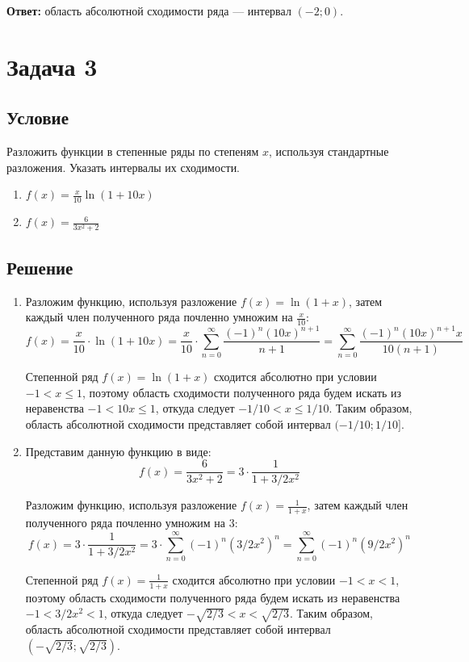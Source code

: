 \documentclass[12pt]{article}
\begin{document}
	\hspace{150pt}\textbf{Ответ:} область абсолютной сходимости ряда --- интервал $ (-2;0) $.

	\newpage

	\section*{Задача 3}	
	\subsection*{Условие}
	
	Разложить функции в степенные ряды по степеням $ x $, используя стандартные разложения. Указать интервалы их сходимости.

	\begin{enumerate}
		\item $ f(x) = \frac{x}{10} \ln{(1 + 10x)} $
		\item $ f(x) = \frac{6}{3x^2 + 2} $
	\end{enumerate}

	\subsection*{Решение}

	\begin{enumerate}[wide, labelwidth=!, labelindent=0pt]
		\item Разложим функцию, используя разложение $ f(x) = \ln{(1 + x)} $, затем каждый член полученного ряда почленно умножим на $ \frac{x}{10} $:
		$$ f(x) = \frac{x}{10} \cdot \ln{(1 + 10x)} = \frac{x}{10} \cdot \sum_{n=0}^{\infty} \frac{(-1)^{n} (10x)^{n+1}}{n + 1} = \sum_{n=0}^{\infty} \frac{(-1)^{n} (10x)^{n+1} x}{10(n + 1)} $$

		Степенной ряд $ f(x) = \ln{(1 + x)} $ сходится абсолютно при условии $ -1 < x \leq 1  $, поэтому область сходимости полученного ряда будем искать из неравенства $ -1 < 10x \leq 1  $, откуда следует $ -1/10 < x \leq 1/10  $. Таким образом, область абсолютной сходимости представляет собой интервал $ (-1/10;1/10] $.

		\item Представим данную функцию в виде:
		$$ f(x) = \frac{6}{3x^2 + 2} = 3 \cdot \frac{1}{1 + 3/2x^2} $$

		Разложим функцию, используя разложение $ f(x) = \frac{1}{1 + x} $, затем каждый член полученного ряда почленно умножим на $ 3 $:
		$$ f(x) = 3 \cdot \frac{1}{1 + 3/2x^2} = 3 \cdot \sum_{n=0}^{\infty} (-1)^{n} (3/2x^2)^n  = \sum_{n=0}^{\infty} (-1)^{n} (9/2x^2)^n $$

		Степенной ряд  $ f(x) = \frac{1}{1 + x} $ сходится абсолютно при условии $ -1 < x < 1  $, поэтому область сходимости полученного ряда будем искать из неравенства $ -1 < 3/2x^2 < 1  $, откуда следует $ -\sqrt{2/3} < x < \sqrt{2/3} $. Таким образом, область абсолютной сходимости представляет собой интервал $ (-\sqrt{2/3};\sqrt{2/3}) $.
	\end{enumerate}
\end{document}
